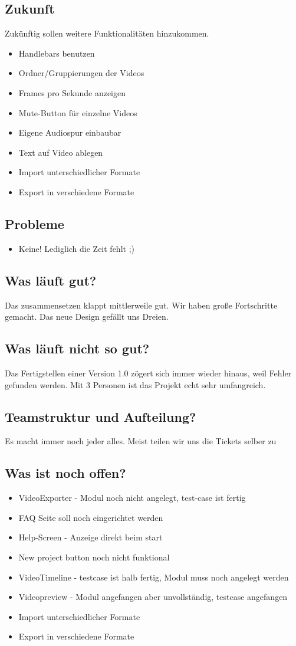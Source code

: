 \documentclass[a4paper,10pt]{scrartcl}
\begin{document}
\subsection{Zukunft}
Zukünftig sollen weitere Funktionalitäten hinzukommen. 
\begin{itemize}
    \item Handlebars benutzen
    \item Ordner/Gruppierungen der Videos
    \item Frames pro Sekunde anzeigen
    \item Mute-Button für einzelne Videos
    \item Eigene Audiospur einbaubar
    \item Text auf Video ablegen
    \item Import unterschiedlicher Formate
	\item Export in verschiedene Formate
	\end{itemize}
\subsection{Probleme}
\begin{itemize}
	\item Keine! Lediglich die Zeit fehlt ;)
	\end{itemize}
\subsection{Was läuft gut?}
Das zusammensetzen klappt mittlerweile gut. Wir haben große Fortschritte gemacht. Das neue Design gefällt uns Dreien.
\subsection{Was läuft nicht so gut?}
Das Fertigstellen einer Version 1.0 zögert sich immer wieder hinaus, weil Fehler gefunden werden. Mit 3 Personen ist das Projekt echt sehr umfangreich.
\subsection{Teamstruktur und Aufteilung?}
Es macht immer noch jeder alles. Meist teilen wir uns die Tickets selber zu
\subsection{Was ist noch offen?}
\begin{itemize}
    \item VideoExporter - Modul noch nicht angelegt, test-case ist fertig
    \item FAQ Seite soll noch eingerichtet werden
    \item Help-Screen - Anzeige direkt beim start
    \item New project button noch nicht funktional
    \item VideoTimeline - testcase ist halb fertig, Modul muss noch angelegt werden
    \item Videopreview - Modul angefangen aber unvollständig, testcase angefangen
    \item Import unterschiedlicher Formate
	\item Export in verschiedene Formate
	\end{itemize}
\end{document}
